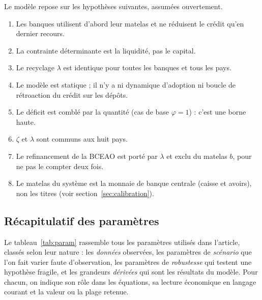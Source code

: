 \documentclass[11pt,a4paper]{article}
\begin{document}
	Le modèle repose sur les hypothèses suivantes, assumées ouvertement.
	\begin{enumerate}[label=\textbf{H\arabic*.},nosep]
		\item Les banques utilisent d'abord leur matelas et ne réduisent le crédit qu'en dernier recours.
		\item La contrainte déterminante est la liquidité, pas le capital.
		\item Le recyclage $\lambda$ est identique pour toutes les banques et tous les pays.
		\item Le modèle est statique ; il n'y a ni dynamique d'adoption ni boucle de rétroaction du crédit sur les dépôts.
		\item Le déficit est comblé par la quantité (cas de base $\varphi=1$) : c'est une borne haute.
		\item $\zeta$ et $\lambda$ sont communs aux huit pays.
		\item Le refinancement de la BCEAO est porté par $\lambda$ et exclu du matelas $b$, pour ne pas le compter deux fois.
		\item Le matelas du système est la monnaie de banque centrale (caisse et avoirs), non les titres (voir section~\ref{sec:calibration}).
	\end{enumerate}
	
\newpage
	
	\subsection{Récapitulatif des paramètres}\label{sec:param}
	
	Le tableau~\ref{tab:param} rassemble tous les paramètres utilisés dans l'article, classés selon leur nature : les \emph{données} observées, les paramètres de \emph{scénario} que l'on fait varier faute d'observation, les paramètres de \emph{robustesse} qui testent une hypothèse fragile, et les grandeurs \emph{dérivées} qui sont les résultats du modèle. Pour chacun, on indique son rôle dans les équations, sa lecture économique en langage courant et la valeur ou la plage retenue.
	
\end{document}
